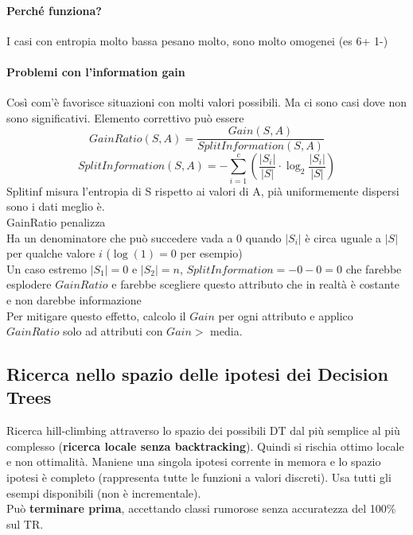 \documentclass[10pt]{book}
\begin{document}
\paragraph{Perché funziona?} I casi con entropia molto bassa pesano molto, sono molto omogenei (es 6+ 1-)
\paragraph{Problemi con l'information gain} Così com'è favorisce situazioni con molti valori possibili. Ma ci sono casi dove non sono significativi. %
Elemento correttivo può essere $$GainRatio(S,A) = \frac{Gain(S,A)}{SplitInformation(S,A)}$$
$$SplitInformation(S,A) = -\sum_{i=1}^c\left( \frac{|S_i|}{|S|} \cdot \log_2 \frac{|S_i|}{|S|} \right)$$
Splitinf misura l'entropia di S rispetto ai valori di A, pià uniformemente dispersi sono i dati meglio è.\\
GainRatio penalizza\\ %
Ha un denominatore che può succedere vada a 0 quando $|S_i|$ è circa uguale a $|S|$ per qualche valore $i$ ($\log(1) = 0$ per esempio)\\
Un caso estremo $|S_1|=0$ e $|S_2| = n$, $SplitInformation = -0 -0 = 0$ che farebbe esplodere $GainRatio$ e farebbe scegliere questo attributo che in realtà è costante e non darebbe informazione\\
Per mitigare questo effetto, calcolo il $Gain$ per ogni attributo e applico $GainRatio$ solo ad attributi con $Gain >$ media.
\subsection{Ricerca nello spazio delle ipotesi dei Decision Trees}
Ricerca hill-climbing attraverso lo spazio dei possibili DT dal più semplice al più complesso (\textbf{ricerca locale senza backtracking}). Quindi si rischia ottimo locale e non ottimalità. Maniene una singola ipotesi corrente in memora e lo spazio ipotesi è completo (rappresenta tutte le funzioni a valori discreti). Usa tutti gli esempi disponibili (non è incrementale).\\
Può \textbf{terminare prima}, accettando classi rumorose senza accuratezza del 100\% sul TR.
\end{document}

